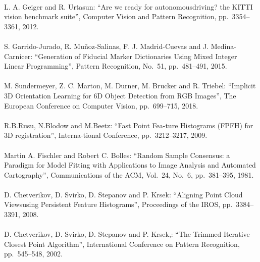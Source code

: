 \begin{mythebibliography}{}
\leavevmode \\L. A. Geiger and R. Urtasun:
\newblock ``Are we ready for autonomousdriving? the KITTI vision benchmark suite'',
\newblock Computer Vision and Pattern Recognition, pp.~3354--3361, 2012.
\\

\leavevmode \\S. Garrido-Jurado, R. Muñoz-Salinas, F. J. Madrid-Cuevas and J. Medina-Carnicer:
\newblock ``Generation of Fiducial Marker Dictionaries Using Mixed Integer Linear Programming'',
\newblock Pattern Recognition, No.~51, pp.~481--491, 2015.
\\

\leavevmode \\M. Sundermeyer, Z. C. Marton, M. Durner, M. Brucker and R. Triebel:
\newblock ``Implicit 3D Orientation Learning for 6D Object Detection from RGB Images'',
\newblock The European Conference on Computer Vision, pp.~699--715, 2018.
\\

\leavevmode \\R.B.Rusu, N.Blodow and M.Beetz:
\newblock ``Fast Point Fea-ture Histograms (FPFH) for 3D registration'',
\newblock Interna-tional Conference, pp.~3212--3217, 2009.
\\

\leavevmode \\Martin A. Fischler and Robert C. Bolles:
\newblock ``Random Sample Consensus: a Paradigm for Model Fitting with Applications to Image Analysis and Automated Cartography'',
\newblock Communications of the ACM, Vol.~24, No.~6, pp.~381--395, 1981.
\\

\leavevmode \\D. Chetverikov, D. Svirko, D. Stepanov and P. Krsek:
\newblock ``Aligning Point Cloud Viewsusing Persistent Feature Histograms'',
\newblock Proceedings of the  IROS, pp.~3384--3391, 2008.
\\

\leavevmode \\D. Chetverikov, D. Svirko, D. Stepanov and P. Krsek,:
\newblock ``The Trimmed Iterative Closest Point Algorithm'',
\newblock  International  Conference  on Pattern Recognition, pp.~545--548, 2002.
\\




\end{mythebibliography}
